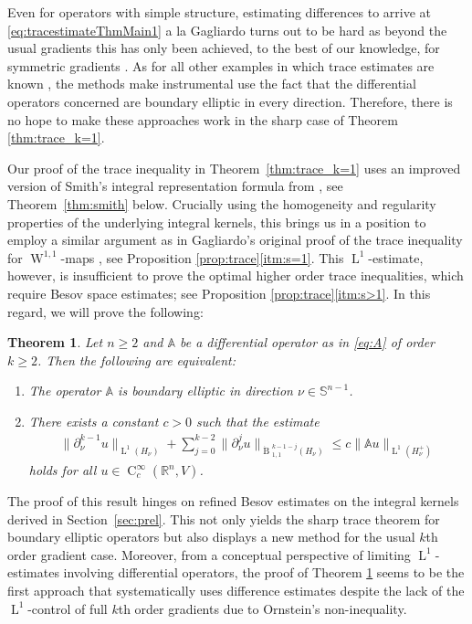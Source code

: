 \documentclass[a4paper,10pt]{amsart}
\newcommand{\R}{\mathbb R}
\renewcommand{\leq}{\leqslant}
\newcommand{\lebe}{\operatorname{L}}
\newcommand{\sobo}{\operatorname{W}}
\newcommand{\hold}{\operatorname{C}}
\newcommand{\A}{\mathbb{A}}
\newcommand{\besov}{\operatorname{B}}
\numberwithin{equation}{section}
\newtheorem{theorem}{Theorem}[section]
\theoremstyle{remark}
\numberwithin{equation}{section}
\begin{document}
	Even for operators with simple structure, estimating {differences} to arrive at \eqref{eq:tracestimateThmMain1} a la Gagliardo \cite{Gag} turns out to be hard as beyond the usual gradients this has only been achieved,  to the best of our knowledge, for symmetric gradients \cite{StrangTemam,Babadjian}. As for all other examples in which trace estimates are known \cite{BDG,DieGme21,GRVS}, the methods make instrumental use the fact that the differential operators concerned are boundary elliptic in every direction. Therefore, there is no hope to make these approaches work in the sharp case of Theorem \ref{thm:trace_k=1}. 
	
	
	
	
	Our proof of the trace inequality in Theorem~\ref{thm:trace_k=1} uses an improved version of Smith's integral representation formula from \cite{Smith}, see Theorem~\ref{thm:smith} below. Crucially using the homogeneity and regularity properties of the underlying integral kernels, this brings us in a position to employ a similar argument as in Gagliardo's original proof of the trace inequality for $\sobo^{1,1}$-maps  \cite{Gag}, see Proposition \ref{prop:trace}\ref{itm:s=1}. This $\lebe^1$-estimate, however, is insufficient to prove the optimal higher order trace inequalities, which require Besov space estimates; see Proposition \ref{prop:trace}\ref{itm:s>1}. In this regard, we will prove the following:
	\begin{theorem}\label{thm:trace_k>1}
		Let \(n \ge 2\) and $\A$ be a differential operator as in \eqref{eq:A}  of order $k\geq 2$. Then the  following are equivalent:
		\begin{enumerate}
			\item\label{itm:k>1_a} The operator $\A$ is boundary elliptic  in direction $\nu\in\mathbb S^{n-1}$.
			\item\label{itm:k>1_b} There exists a constant $c>0$ such that the estimate
			\begin{align*}
				\|\partial^{k-1}_\nu u\|_{\lebe^1(H_\nu)}+\sum_{j=0}^{k-2}\|\partial_\nu^j u\|_{\dot{\besov}{^{k-1-j}_{1,1}}(H_\nu)}\leq c\|\A u\|_{\lebe^1(H_\nu^+)}
			\end{align*}
			holds for all $u\in\hold^\infty_c(\R^n,V)$.
		\end{enumerate}
	\end{theorem}
	The proof of this result hinges on refined Besov estimates on the integral kernels derived in Section~\ref{sec:prel}. This not only yields the sharp trace theorem for boundary elliptic operators but also displays a new method for the usual $k$th order gradient case. Moreover, from a conceptual  perspective of limiting $\lebe^{1}$-estimates involving differential operators, the proof of Theorem \ref{thm:trace_k>1} seems to be the first approach that systematically uses difference estimates despite the lack of the $\lebe^{1}$-control of full $k$th order gradients due to  Ornstein's non-inequality.
	
\end{document}
